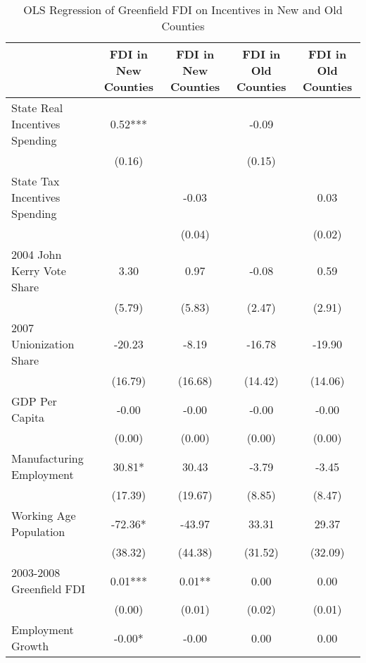 \begin{table}[!htbp]\centering
\def\sym#1{\ifmmode^{#1}\else\(^{#1}\)\fi}
\caption{OLS Regression of Greenfield FDI on Incentives in New and Old Counties}
\begin{tabular}{l*{4}{c}}
\hline\hline
                    &FDI in New Counties   &FDI in New Counties   &FDI in Old Counties   &FDI in Old Counties   \\
\hline
State Real Incentives Spending&        0.52***&               &       -0.09   &               \\
                    &      (0.16)   &               &      (0.15)   &               \\
State Tax Incentives Spending&               &       -0.03   &               &        0.03   \\
                    &               &      (0.04)   &               &      (0.02)   \\
2004 John Kerry Vote Share&        3.30   &        0.97   &       -0.08   &        0.59   \\
                    &      (5.79)   &      (5.83)   &      (2.47)   &      (2.91)   \\
2007 Unionization Share&      -20.23   &       -8.19   &      -16.78   &      -19.90   \\
                    &     (16.79)   &     (16.68)   &     (14.42)   &     (14.06)   \\
GDP Per Capita      &       -0.00   &       -0.00   &       -0.00   &       -0.00   \\
                    &      (0.00)   &      (0.00)   &      (0.00)   &      (0.00)   \\
Manufacturing Employment&       30.81*  &       30.43   &       -3.79   &       -3.45   \\
                    &     (17.39)   &     (19.67)   &      (8.85)   &      (8.47)   \\
Working Age Population&      -72.36*  &      -43.97   &       33.31   &       29.37   \\
                    &     (38.32)   &     (44.38)   &     (31.52)   &     (32.09)   \\
2003-2008 Greenfield FDI&        0.01***&        0.01** &        0.00   &        0.00   \\
                    &      (0.00)   &      (0.01)   &      (0.02)   &      (0.01)   \\
Employment Growth   &       -0.00*  &       -0.00   &        0.00   &        0.00   \\

\end{tabular}
\end{table}
